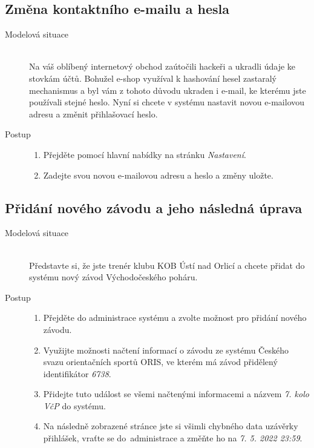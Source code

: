 \subsection{Změna kontaktního e-mailu a hesla}\label{test-case-2}
\begin{description}
    \item[Modelová situace] \hfill \\
        Na váš oblíbený internetový obchod zaútočili hackeři a ukradli údaje ke stovkám účtů. Bohužel e-shop využíval k hashování hesel zastaralý mechanismus a byl vám z tohoto důvodu ukraden i e-mail, ke kterému jste používali stejné heslo. Nyní si chcete v systému nastavit novou e-mailovou adresu a změnit přihlašovací heslo.
        \item[Postup] \hfill
        \vspace{-2mm}
        \begin{enumerate}
            \item Přejděte pomocí hlavní nabídky na stránku \emph{Nastavení}.
            \item Zadejte svou novou e-mailovou adresu a heslo a změny uložte.
        \end{enumerate}
\end{description}

\newpage
\subsection{Přidání nového závodu a jeho následná úprava}\label{test-case-3}
\begin{description}
    \item[Modelová situace] \hfill \\
        Představte si, že jste trenér klubu KOB Ústí nad Orlicí a chcete přidat do systému nový závod Východočeského poháru.
    \item[Postup] \hfill
        \vspace{-2mm}
        \begin{enumerate}
            \item Přejděte do administrace systému a zvolte možnost pro přidání nového závodu.
            \item Využijte možnosti načtení informací o závodu ze systému Českého svazu orientačních sportů ORIS, ve kterém má závod přidělený identifikátor \emph{6738}.
            \item Přidejte tuto událost se všemi načtenými informacemi a názvem \emph{7. kolo VčP} do systému.
            \item Na následně zobrazené stránce jste si všimli chybného data uzávěrky přihlášek, vraťte se do~administrace a změňte ho na \emph{7. 5. 2022 23:59}.
        \end{enumerate}
\end{description}

